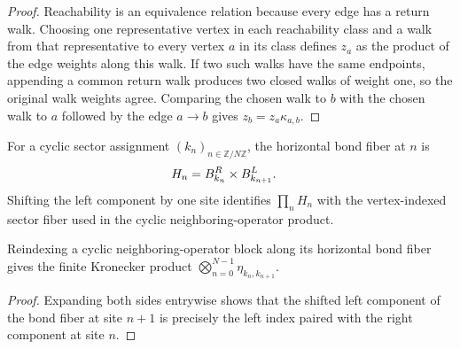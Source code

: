\begin{proof}
    \leanok
    Reachability is an equivalence relation because every edge has a return
    walk. Choosing one representative vertex in each reachability class and a
    walk from that representative to every vertex $a$ in its class defines
    $z_a$ as the product of the edge weights along this walk. If two such walks
    have the same endpoints, appending a common return walk produces two closed
    walks of weight one, so the original walk weights agree. Comparing the
    chosen walk to $b$ with the chosen walk to $a$ followed by the edge
    $a\to b$ gives $z_b=z_a\kappa_{a,b}$.
\end{proof}

\begin{definition}%
    \label{def:mpdo_eta_cycle_fiber}
    \leanok
    For a cyclic sector assignment $(k_n)_{n\in\mathbb Z/N\mathbb Z}$, the
    horizontal bond fiber at $n$ is
    \begin{align}
        H_n & =B^R_{k_n}\times B^L_{k_{n+1}}.
        \notag
    \end{align}
    Shifting the left component by one site identifies
    $\prod_n H_n$ with the vertex-indexed sector fiber used in the cyclic
    neighboring-operator product.
\end{definition}

\begin{lemma}%
    \label{lem:mpdo_eta_cycle_fin_kronecker}
    \leanok
    Reindexing a cyclic neighboring-operator block along its horizontal bond
    fiber gives the finite Kronecker product
    $\bigotimes_{n=0}^{N-1}\eta_{k_n,k_{n+1}}$.
\end{lemma}

\begin{proof}
    \leanok
    Expanding both sides entrywise shows that the shifted left component of the
    bond fiber at site $n+1$ is precisely the left index paired with the right
    component at site $n$.
\end{proof}

